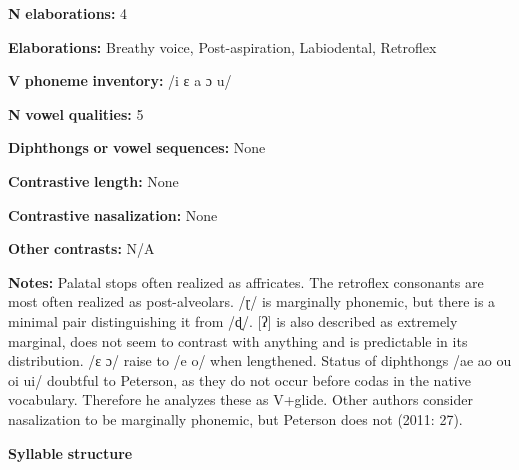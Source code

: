 \documentclass[output=paper]{langsci/langscibook}
\begin{document}
\begin{styleBody}
\textbf{N} \textbf{elaborations:} 4
\end{styleBody}

\begin{styleBody}
\textbf{Elaborations:} Breathy voice, Post-aspiration, Labiodental, Retroflex
\end{styleBody}

\begin{styleBody}
\textbf{V} \textbf{phoneme} \textbf{inventory:} /i ɛ a ɔ u/
\end{styleBody}

\begin{styleBody}
\textbf{N} \textbf{vowel} \textbf{qualities:} 5
\end{styleBody}

\begin{styleBody}
\textbf{Diphthongs} \textbf{or} \textbf{vowel} \textbf{sequences:} None
\end{styleBody}

\begin{styleBody}
\textbf{Contrastive} \textbf{length:} None
\end{styleBody}

\begin{styleBody}
\textbf{Contrastive} \textbf{nasalization:} None
\end{styleBody}

\begin{styleBody}
\textbf{Other} \textbf{contrasts:} N/A
\end{styleBody}

\begin{styleBody}
\textbf{Notes:} Palatal stops often realized as affricates. The retroflex consonants are most often realized as post-alveolars. /ɽ/ is marginally phonemic, but there is a minimal pair distinguishing it from /ɖ/. [ʔ] is also described as extremely marginal, does not seem to contrast with anything and is predictable in its distribution. /ɛ ɔ/ raise to /e o/ when lengthened. Status of diphthongs /ae ao ou oi ui/ doubtful to Peterson, as they do not occur before codas in the native vocabulary. Therefore he analyzes these as V+glide. Other authors consider nasalization to be marginally phonemic, but Peterson does not (2011: 27).
\end{styleBody}

\begin{styleBody}
\textbf{Syllable} \textbf{structure}
\end{styleBody}
\end{document}

